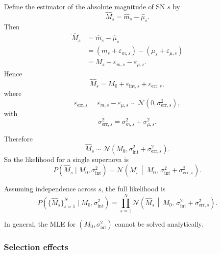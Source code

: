 \documentclass[11pt, titlepage]{article} %
\numberwithin{equation}{section}
\theoremstyle{definition}
\numberwithin{assumption}{section}
\begin{document}
Define the estimator of the absolute magnitude of SN $s$ by
\begin{equation*}
    \hat M_s=\hat m_s-\hat \mu_s.
\end{equation*}
Then
\begin{align*}
    \hat M_s
    &= \hat m_s-\hat \mu_s\\
    &= (m_s+\varepsilon_{m,s})-(\mu_s+\varepsilon_{\mu,s})\\
    &= M_s+\varepsilon_{m,s}-\varepsilon_{\mu,s}.
\end{align*}
Hence
\begin{equation*}
    \hat M_s = M_0+\varepsilon_{\mathrm{int},s}+\varepsilon_{\mathrm{err},s},
\end{equation*}
where
\begin{equation*}
    \varepsilon_{\mathrm{err},s}
    =
    \varepsilon_{m,s}-\varepsilon_{\mu,s}
    \sim
    \mathcal{N}(0,\sigma_{\mathrm{err},s}^2),
\end{equation*}
with
\begin{equation*}
    \sigma_{\mathrm{err},s}^2=\sigma_{m,s}^2+\sigma_{\mu,s}^2.
\end{equation*}

Therefore
\begin{equation*}
    \hat M_s \sim \mathcal{N}\!\left(M_0,\sigma_{\mathrm{int}}^2+\sigma_{\mathrm{err},s}^2\right).
\end{equation*}
So the likelihood for a single supernova is
\begin{equation*}
    P(\hat M_s\mid M_0,\sigma_{\mathrm{int}}^2)
    =
    \mathcal{N}\!\left(
    \hat M_s
    \,\middle|\,
    M_0,\,
    \sigma_{\mathrm{int}}^2+\sigma_{\mathrm{err},s}^2
    \right).
\end{equation*}

Assuming independence across $s$, the full likelihood is
\begin{equation*}
    P(\{\hat M_s\}_{s=1}^N\mid M_0,\sigma_{\mathrm{int}}^2)
    =
    \prod_{s=1}^N
    \mathcal{N}\!\left(
    \hat M_s
    \,\middle|\,
    M_0,\,
    \sigma_{\mathrm{int}}^2+\sigma_{\mathrm{err},s}^2
    \right).
\end{equation*}

In general, the MLE for $(M_0,\sigma_{\mathrm{int}}^2)$ cannot be solved analytically.

\subsubsection*{Selection effects}
\end{document}
